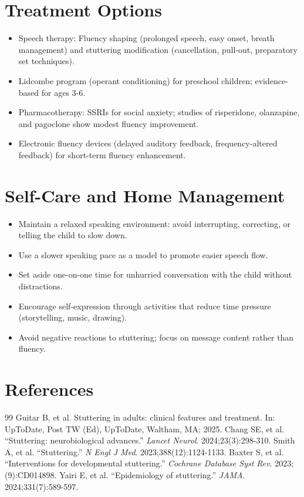\section*{Treatment Options}
\begin{itemize}
  \item Speech therapy: Fluency shaping (prolonged speech, easy onset, breath management) and stuttering modification (cancellation, pull-out, preparatory set techniques).
  \item Lidcombe program (operant conditioning) for preschool children; evidence-based for ages 3-6.
  \item Pharmacotherapy: SSRIs for social anxiety; studies of risperidone, olanzapine, and pagoclone show modest fluency improvement.
  \item Electronic fluency devices (delayed auditory feedback, frequency-altered feedback) for short-term fluency enhancement.
\end{itemize}

\section*{Self-Care and Home Management}
\begin{itemize}
  \item Maintain a relaxed speaking environment: avoid interrupting, correcting, or telling the child to slow down.
  \item Use a slower speaking pace as a model to promote easier speech flow.
  \item Set aside one-on-one time for unhurried conversation with the child without distractions.
  \item Encourage self-expression through activities that reduce time pressure (storytelling, music, drawing).
  \item Avoid negative reactions to stuttering; focus on message content rather than fluency.
\end{itemize}

\section*{References}
\begin{thebibliography}{99}
 Guitar B, et al. Stuttering in adults: clinical features and treatment. In: UpToDate, Post TW (Ed), UpToDate, Waltham, MA; 2025.
 Chang SE, et al. ``Stuttering: neurobiological advances.'' \emph{Lancet Neurol}. 2024;23(3):298-310.
 Smith A, et al. ``Stuttering.'' \emph{N Engl J Med}. 2023;388(12):1124-1133.
 Baxter S, et al. ``Interventions for developmental stuttering.'' \emph{Cochrane Database Syst Rev}. 2023;(9):CD014898.
 Yairi E, et al. ``Epidemiology of stuttering.'' \emph{JAMA}. 2024;331(7):589-597.
\end{thebibliography}
